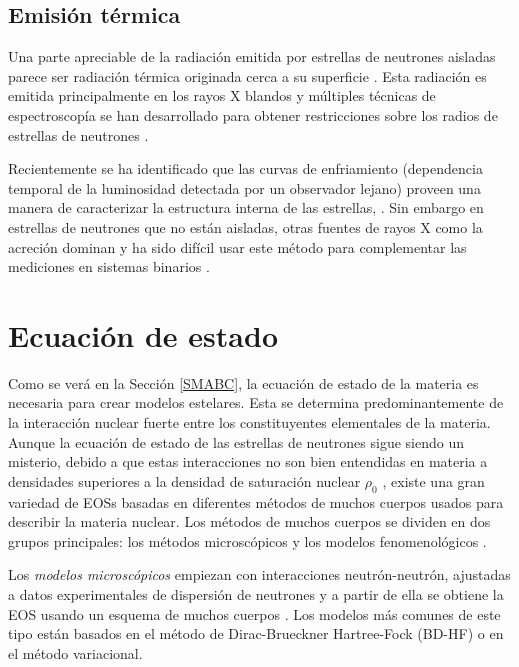 
\subsection{Emisión térmica}

\noindent Una parte apreciable de la radiación emitida por estrellas de neutrones aisladas parece ser radiación térmica originada cerca a su superficie \cite{Potekhin2010}. Esta radiación es emitida principalmente en los rayos X blandos y múltiples técnicas de espectroscopía se han desarrollado para obtener restricciones sobre los radios de estrellas de neutrones \cite{Ozel2016}.


Recientemente se ha identificado que las curvas de enfriamiento (dependencia temporal de la luminosidad detectada por un observador lejano) proveen una manera de caracterizar la estructura interna de las estrellas, \cite{Yakovlev2004}. Sin embargo en estrellas de neutrones que no están aisladas, otras fuentes de rayos X como la acreción dominan y ha sido difícil usar este método para complementar las mediciones en sistemas binarios \cite{Potekhin2010}.


\section{Ecuación de estado}\label{EOS}

\noindent Como se verá en la Sección \ref{SMABC}, la ecuación de estado de la materia es necesaria para crear modelos estelares. Esta se determina predominantemente de la interacción nuclear fuerte entre los constituyentes elementales de la materia. Aunque la ecuación de estado de las estrellas de neutrones sigue siendo un misterio, debido a que estas interacciones no son bien entendidas en materia a densidades superiores a la densidad de saturación nuclear $\rho_0$ \cite{Haensel2007}, existe una gran variedad de EOSs basadas en diferentes métodos de muchos cuerpos usados para describir la materia nuclear. Los métodos de muchos cuerpos se dividen en dos grupos principales: los métodos microscópicos y los modelos fenomenológicos \cite{Rezzolla2018,Giai2010}.

Los \emph{modelos microscópicos} empiezan con interacciones neutrón-neutrón, ajustadas a datos experimentales de dispersión de neutrones y a partir de ella se obtiene la EOS usando un esquema de muchos cuerpos \cite{Ring1980}. Los modelos más comunes de este tipo están basados en el método de Dirac-Brueckner Hartree-Fock (BD-HF) o en el método variacional.

